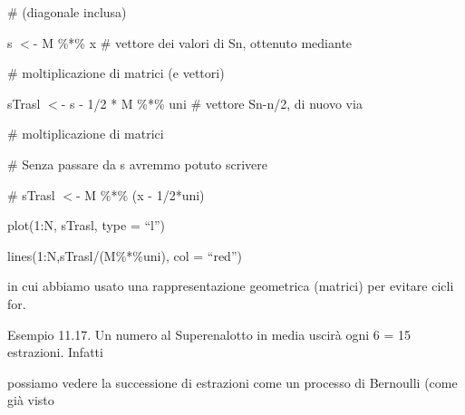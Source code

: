 \documentclass[a4paper,portrait,12pt]{article}
\begin{document}
\begin{flushleft}
\# (diagonale inclusa)
\end{flushleft}


\begin{flushleft}
s $<$- M \%*\% x \# vettore dei valori di Sn, ottenuto mediante
\end{flushleft}


\begin{flushleft}
\# moltiplicazione di matrici (e vettori)
\end{flushleft}


\begin{flushleft}
sTrasl $<$- s - 1/2 * M \%*\% uni \# vettore Sn-n/2, di nuovo via
\end{flushleft}


\begin{flushleft}
\# moltiplicazione di matrici
\end{flushleft}


\begin{flushleft}
\# Senza passare da s avremmo potuto scrivere
\end{flushleft}


\begin{flushleft}
\# sTrasl $<$- M \%*\% (x - 1/2*uni)
\end{flushleft}


\begin{flushleft}
plot(1:N, sTrasl, type = {``}l'')
\end{flushleft}


\begin{flushleft}
lines(1:N,sTrasl/(M\%*\%uni), col = {``}red'')
\end{flushleft}


\begin{flushleft}
in cui abbiamo usato una rappresentazione geometrica (matrici) per evitare cicli for.
\end{flushleft}





\begin{flushleft}
Esempio 11.17. Un numero al Superenalotto in media uscir\`{a} ogni 6 = 15 estrazioni. Infatti
\end{flushleft}


\begin{flushleft}
possiamo vedere la successione di estrazioni come un processo di Bernoulli (come gi\`{a} visto
\end{flushleft}
\end{document}
